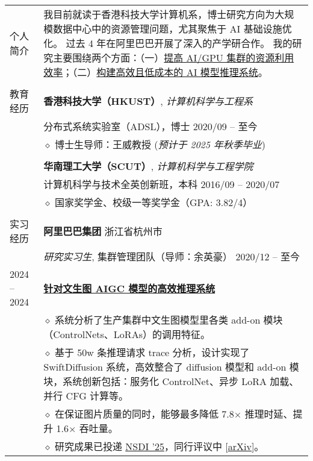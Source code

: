 \documentclass[letterpaper, 10pt]{article}
\begin{document}
\begin{longtable}{p{0.7in}p{6.0in}}

{个人简介}
&
    我目前就读于香港科技大学计算机系，博士研究方向为大规模数据中心中的资源管理问题，尤其聚焦于 AI 基础设施优化。
    过去 4 年在阿里巴巴开展了深入的产学研合作。
    我的研究主要围绕两个方面：（一）\underline{提高 AI/GPU 集群的资源利用效率}；（二）\underline{构建高效且低成本的 AI 模型推理系统}。
    \\
& \\

{教育经历}
& \textbf{香港科技大学（HKUST）}, \textit{计算机科学与工程系} \\
& 分布式系统实验室（ADSL），博士 \hfill 2020/09 -- 至今 \\
& $\diamond$ 博士生导师：王威教授 \hfill (\textit{预计于 2025 年秋季毕业}) \\
& \\

& \textbf{华南理工大学（SCUT）}, \textit{计算机科学与工程学院} \\
& 计算机科学与技术全英创新班，本科 \hfill 2016/09 -- 2020/07 \\
& $\diamond$ 国家奖学金、校级一等奖学金（GPA: 3.82/4） \\
& \\

{实习经历}
& {\textbf{阿里巴巴集团}} \hfill 浙江省杭州市 \\
& \textit{研究实习生}, 集群管理团队（导师：余英豪） \hfill 2020/12 -- 至今 \\

2024 -- 2024
& \textbf{\underline{针对文生图 AIGC 模型的高效推理系统}} \hfill \\
    & $\diamond$ 系统分析了生产集群中文生图模型里各类 add-on 模块（ControlNets、LoRAs）的调用特征。\\
    & $\diamond$ 基于 50w 条推理请求 trace 分析，设计实现了 SwiftDiffusion 系统，高效整合了 diffusion 模型和 add-on 模块，系统创新包括：服务化 ControlNet、异步 LoRA 加载、并行 CFG 计算等。\\
    & $\diamond$ 在保证图片质量的同时，能够最多降低 7.8$\times$ 推理时延、提升 1.6$\times$ 吞吐量。\\
    & $\diamond$ 研究成果已投递 \underline{NSDI '25}，同行评议中 [\href{https://arxiv.org/abs/2407.02031}{\underline{arXiv}}]。\\


\end{longtable}
\end{document}
